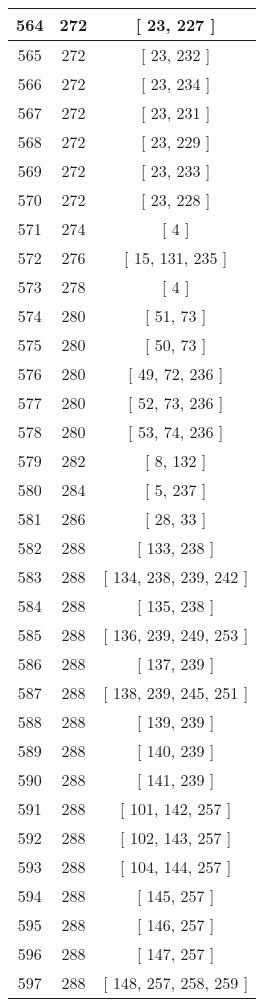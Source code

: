 \begin{center}
\begin{longtable}[H]{|| c c c ||}
564 & 272 & [ 23, 227 ] \\ 
\hline
565 & 272 & [ 23, 232 ] \\ 
\hline
566 & 272 & [ 23, 234 ] \\ 
\hline
567 & 272 & [ 23, 231 ] \\ 
\hline
568 & 272 & [ 23, 229 ] \\ 
\hline
569 & 272 & [ 23, 233 ] \\ 
\hline
570 & 272 & [ 23, 228 ] \\ 
\hline
571 & 274 & [ 4 ] \\ 
\hline
572 & 276 & [ 15, 131, 235 ] \\ 
\hline
573 & 278 & [ 4 ] \\ 
\hline
574 & 280 & [ 51, 73 ] \\ 
\hline
575 & 280 & [ 50, 73 ] \\ 
\hline
576 & 280 & [ 49, 72, 236 ] \\ 
\hline
577 & 280 & [ 52, 73, 236 ] \\ 
\hline
578 & 280 & [ 53, 74, 236 ] \\ 
\hline
579 & 282 & [ 8, 132 ] \\ 
\hline
580 & 284 & [ 5, 237 ] \\ 
\hline
581 & 286 & [ 28, 33 ] \\ 
\hline
582 & 288 & [ 133, 238 ] \\ 
\hline
583 & 288 & [ 134, 238, 239, 242 ] \\ 
\hline
584 & 288 & [ 135, 238 ] \\ 
\hline
585 & 288 & [ 136, 239, 249, 253 ] \\ 
\hline
586 & 288 & [ 137, 239 ] \\ 
\hline
587 & 288 & [ 138, 239, 245, 251 ] \\ 
\hline
588 & 288 & [ 139, 239 ] \\ 
\hline
589 & 288 & [ 140, 239 ] \\ 
\hline
590 & 288 & [ 141, 239 ] \\ 
\hline
591 & 288 & [ 101, 142, 257 ] \\ 
\hline
592 & 288 & [ 102, 143, 257 ] \\ 
\hline
593 & 288 & [ 104, 144, 257 ] \\ 
\hline
594 & 288 & [ 145, 257 ] \\ 
\hline
595 & 288 & [ 146, 257 ] \\ 
\hline
596 & 288 & [ 147, 257 ] \\ 
\hline
597 & 288 & [ 148, 257, 258, 259 ] \\ 

\end{longtable}
\end{center}
